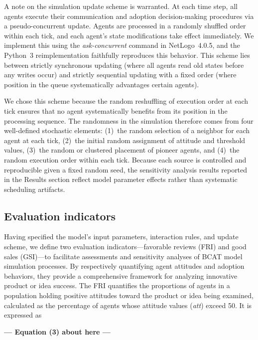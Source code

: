 \documentclass[10pt,letterpaper]{article}
\begin{document}
A note on the simulation update scheme is warranted. At each time step, all agents execute their communication and adoption decision-making procedures via a pseudo-concurrent update. Agents are processed in a randomly shuffled order within each tick, and each agent's state modifications take effect immediately. We implement this using the \textit{ask-concurrent} command in NetLogo~4.0.5, and the Python~3 reimplementation faithfully reproduces this behavior. This scheme lies between strictly synchronous updating (where all agents read old states before any writes occur) and strictly sequential updating with a fixed order (where position in the queue systematically advantages certain agents).

We chose this scheme because the random reshuffling of execution order at each tick ensures that no agent systematically benefits from its position in the processing sequence. The randomness in the simulation therefore comes from four well-defined stochastic elements: (1)~the random selection of a neighbor for each agent at each tick, (2)~the initial random assignment of attitude and threshold values, (3)~the random or clustered placement of pioneer agents, and (4)~the random execution order within each tick. Because each source is controlled and reproducible given a fixed random seed, the sensitivity analysis results reported in the Results section reflect model parameter effects rather than systematic scheduling artifacts.

\subsection*{Evaluation indicators}

Having specified the model's input parameters, interaction rules, and update scheme, we define two evaluation indicators---favorable reviews (FRI) and good sales (GSI)---to facilitate assessments and sensitivity analyses of BCAT model simulation processes. By respectively quantifying agent attitudes and adoption behaviors, they provide a comprehensive framework for analyzing innovative product or idea success. The FRI quantifies the proportions of agents in a population holding positive attitudes toward the product or idea being examined, calculated as the percentage of agents whose attitude values (\textit{att}) exceed 50. It is expressed as


\begin{center}\textbf{--- Equation (3) about here ---}\end{center}
\end{document}
